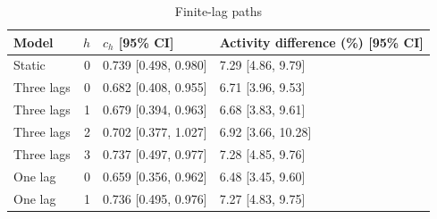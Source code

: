 \begin{table}[htbp]\centering\setlength{\tabcolsep}{4pt}\small
\caption{Finite-lag paths}\label{tab:si_dynamic_paths}
\begin{tabular}{@{}lrll@{}}\toprule
Model & $h$ & $c_h$ [95\% CI] & Activity difference (\%) [95\% CI]\\\midrule
Static & 0 & 0.739 [0.498, 0.980] & 7.29 [4.86, 9.79]\\
Three lags & 0 & 0.682 [0.408, 0.955] & 6.71 [3.96, 9.53]\\
Three lags & 1 & 0.679 [0.394, 0.963] & 6.68 [3.83, 9.61]\\
Three lags & 2 & 0.702 [0.377, 1.027] & 6.92 [3.66, 10.28]\\
Three lags & 3 & 0.737 [0.497, 0.977] & 7.28 [4.85, 9.76]\\
One lag & 0 & 0.659 [0.356, 0.962] & 6.48 [3.45, 9.60]\\
One lag & 1 & 0.736 [0.495, 0.976] & 7.27 [4.83, 9.75]\\
\bottomrule\end{tabular}
\end{table}
